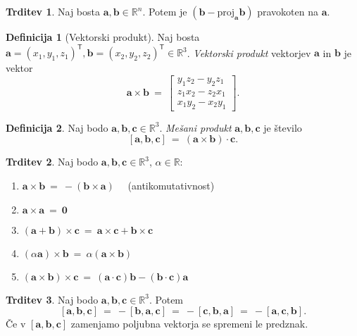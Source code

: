 \documentclass[11pt]{article}
\newcommand{\R}{\mathbb{R}}
\renewcommand{\a}{\mathbf{a}}
\renewcommand{\b}{\mathbf{b}}
\renewcommand{\c}{\mathbf{c}}
\newcommand{\0}{\mathbf{0}}
\newcommand{\T}{\mathsf{T}}
\theoremstyle{definition}
\newtheorem{definicija}{Definicija}[section]
\theoremstyle{definition}
\newtheorem{trditev}{Trditev}[section]
\theoremstyle{definition}
\theoremstyle{definition}
\begin{document}
\begin{trditev}

Naj bosta $\a,\b \in \R^n$. Potem je $(\b - \text{proj}_\a{\b})$ pravokoten na $\a$.

\end{trditev}
\vspace{0.5cm}

\begin{definicija}[Vektorski produkt]

Naj bosta \hbox{$\a=(x_1, y_1, z_1)^\T,\b=(x_2, y_2, z_2)^\T \in \R^3$}. \textit{Vektorski produkt} vektorjev $\a$ in $\b$ je vektor
$$\a \times \b ~=~ \begin{bmatrix}
y_1 z_2 - y_2 z_1 \\
z_1 x_2 - z_2 x_1 \\
x_1 y_2 - x_2 y_1
\end{bmatrix}.$$

\end{definicija}
\vspace{0.5cm}

\begin{definicija}

Naj bodo $\a,\b,\c \in \R^3$. \textit{Mešani produkt} $\a,\b,\c$ je število
$$[\a,\b,\c] ~=~ (\a\times\b)\cdot\c.$$

\end{definicija}
\vspace{0.5cm}

\begin{trditev}

Naj bodo $\a,\b,\c \in \R^3$, $\alpha \in \R$:
\begin{enumerate}
	\item $\a\times\b ~=~ -(\b\times\a)$ ~~(antikomutativnost)
	\item $\a\times\a ~=~ \0$
	\item $(\a + \b)\times\c ~=~ \a\times\c + \b\times\c$
	\item $(\alpha\a)\times\b ~=~ \alpha(\a\times\b)$
	\item $(\a\times\b)\times\c ~=~ (\a\cdot\c)\b - (\b\cdot\c)\a$
\end{enumerate}

\end{trditev}
\vspace{0.5cm}

\begin{trditev}

Naj bodo $\a,\b,\c \in \R^3$. Potem
$$[\a,\b,\c] ~=~ -[\b,\a,\c] ~=~ -[\c,\b,\a] ~=~ -[\a,\c,\b].$$
Če v $[\a,\b,\c]$ zamenjamo poljubna vektorja se spremeni le predznak.

\end{trditev}
\vspace{0.5cm}
\end{document}
